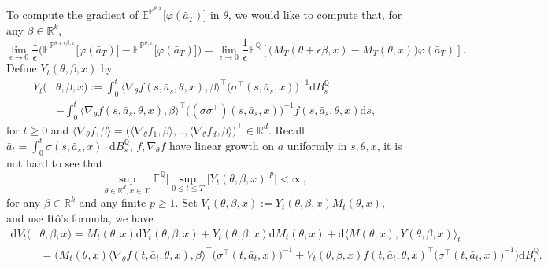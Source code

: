 \documentclass{article}
\newcommand{\1}{\mathbbm{1}}
\numberwithin{equation}{section}
\def\to{\rightarrow}
\def\cX{\mathcal{X}}
\def\d{{\mathrm{d}}}
\def\sE{{\mathbb{E}}}
\def\sP{\mathbb{P}}
\def\sQ{{\mathbb{Q}}}
\def\sR{{\mathbb R}}
\begin{document}
To compute the gradient of 
$\sE^{\sP^{\theta,x}}\big[\varphi(\bar a_T)\big] $ in $\theta$, we would like to compute that, for any $\beta\in\sR^k$,
\begin{equation*}
   \lim_{\epsilon\to 0}\frac{1}{\epsilon}\Big(\sE^{\sP^{\theta+\epsilon\beta,x}}\big[\varphi(\bar a_T)\big]-\sE^{\sP^{\theta,x}}\big[\varphi(\bar a_T)\big]\Big)=\lim_{\epsilon\to0}\frac{1}{\epsilon}\sE^\sQ\left[\big(M_T({\theta+\epsilon\beta},x)-M_T({\theta},x)\big)\varphi(\bar a_T)\right].
\end{equation*}
Define $Y_t(\theta,\beta,x)$ by
\begin{equation*}
    \begin{aligned}
    Y_t(&\theta,\beta,x) := \int_0^t{\big\langle\nabla_\theta f(s,\bar a_s,\theta,x),\beta\big\rangle^\top }{\big(\sigma^\top(s,\bar a_s,x)\big)^{-1}}\d B_s^\sQ
    \\
    &-\int_0^t{\big\langle\nabla_\theta f(s,\bar a_s,\theta,x),\beta\big\rangle^\top \big((\sigma\sigma^\top)(s,\bar a_s,x)\big)^{-1} f(s,\bar a_s,\theta,x)}\d s,
    \end{aligned}
\end{equation*}
for $t\geq 0$ and $\langle\nabla_\theta f,\beta\rangle=\big(\langle\nabla_\theta f_1,\beta\rangle,..,\langle\nabla_\theta f_d,\beta\rangle\big)^\top\in\sR^d$. Recall $\bar a_t=\int_0^t\sigma(s,\bar a_s,x) \cdot \d B_s^\sQ$, $f,\nabla_\theta f$ have linear growth on $a$ uniformly in $s,\theta,x$, it is not hard to see that 
\begin{equation}\label{bddY}
\sup_{\theta\in\sR^d,x\in\cX}\sE^\sQ\Big[\sup_{0\leq t\leq T}\big|Y_t(\theta,\beta,x)\big|^p\Big]<\infty,    
\end{equation}
for any $\beta\in\sR^k$ and any finite $p\geq 1$. Set $V_t({\theta,\beta},x):=Y_t({\theta,\beta},x)M_t(\theta,x)$, and use It\^o's formula, we have
\begin{equation*}
    \begin{aligned}
    \d V_t(&{\theta,\beta},x)=M_t(\theta,x)\d Y_t({\theta,\beta},x)+Y_t({\theta,\beta},x)\d M_t(\theta,x)+\d \big\langle M({\theta},x),Y({\theta,\beta},x)\big\rangle_t
    \\
    &=\bigg({M_t(\theta,x)\big\langle\nabla_\theta f(t,\bar a_t,\theta,x),\beta\big\rangle^\top }{\big(\sigma^\top(t,\bar a_t,x)\big)^{-1}}+{V_t(\theta,\beta,x)f(t,\bar a_t,\theta,x)^\top}{\big(\sigma^\top(t,\bar a_t,x)\big)^{-1}}\bigg)\d B_t^\sQ.
    \end{aligned}
\end{equation*} 
\end{document}
